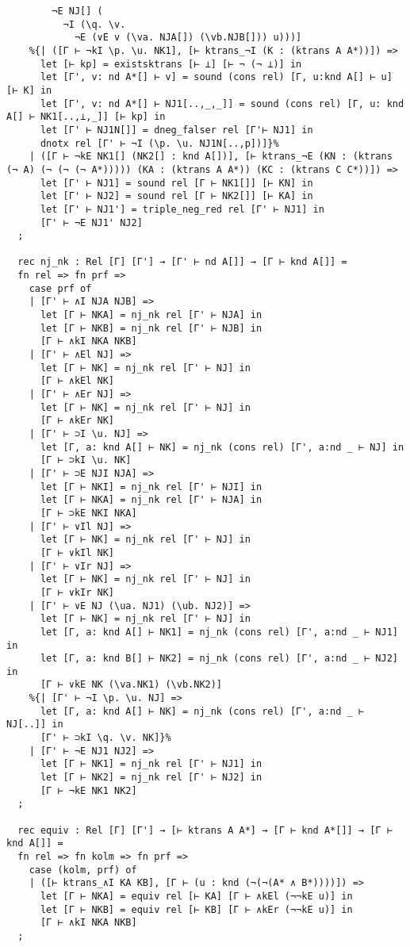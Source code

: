 \documentclass{article}
\begin{document}
\begin{lstlisting}
        ¬E NJ[] (
          ¬I (\q. \v.
            ¬E (∨E v (\va. NJA[]) (\vb.NJB[])) u)))]
    %{| ([Γ ⊢ ¬kI \p. \u. NK1], [⊢ ktrans_¬I (K : (ktrans A A*))]) =>
      let [⊢ kp] = existsktrans [⊢ ⊥] [⊢ ¬ (¬ ⊥)] in
      let [Γ', v: nd A*[] ⊢ v] = sound (cons rel) [Γ, u:knd A[] ⊢ u] [⊢ K] in
      let [Γ', v: nd A*[] ⊢ NJ1[..,_,_]] = sound (cons rel) [Γ, u: knd A[] ⊢ NK1[..,⊥,_]] [⊢ kp] in
      let [Γ' ⊢ NJ1N[]] = dneg_falser rel [Γ'⊢ NJ1] in
      dnotx rel [Γ' ⊢ ¬I (\p. \u. NJ1N[..,p])]}%
    | ([Γ ⊢ ¬kE NK1[] (NK2[] : knd A[])], [⊢ ktrans_¬E (KN : (ktrans (¬ A) (¬ (¬ (¬ A*))))) (KA : (ktrans A A*)) (KC : (ktrans C C*))]) =>
      let [Γ' ⊢ NJ1] = sound rel [Γ ⊢ NK1[]] [⊢ KN] in
      let [Γ' ⊢ NJ2] = sound rel [Γ ⊢ NK2[]] [⊢ KA] in
      let [Γ' ⊢ NJ1'] = triple_neg_red rel [Γ' ⊢ NJ1] in
      [Γ' ⊢ ¬E NJ1' NJ2]
  ;
  
  rec nj_nk : Rel [Γ] [Γ'] → [Γ' ⊢ nd A[]] → [Γ ⊢ knd A[]] = 
  fn rel => fn prf =>
    case prf of
    | [Γ' ⊢ ∧I NJA NJB] =>
      let [Γ ⊢ NKA] = nj_nk rel [Γ' ⊢ NJA] in
      let [Γ ⊢ NKB] = nj_nk rel [Γ' ⊢ NJB] in
      [Γ ⊢ ∧kI NKA NKB]
    | [Γ' ⊢ ∧El NJ] =>
      let [Γ ⊢ NK] = nj_nk rel [Γ' ⊢ NJ] in
      [Γ ⊢ ∧kEl NK]
    | [Γ' ⊢ ∧Er NJ] =>
      let [Γ ⊢ NK] = nj_nk rel [Γ' ⊢ NJ] in
      [Γ ⊢ ∧kEr NK]
    | [Γ' ⊢ ⊃I \u. NJ] =>
      let [Γ, a: knd A[] ⊢ NK] = nj_nk (cons rel) [Γ', a:nd _ ⊢ NJ] in
      [Γ ⊢ ⊃kI \u. NK]
    | [Γ' ⊢ ⊃E NJI NJA] =>
      let [Γ ⊢ NKI] = nj_nk rel [Γ' ⊢ NJI] in
      let [Γ ⊢ NKA] = nj_nk rel [Γ' ⊢ NJA] in
      [Γ ⊢ ⊃kE NKI NKA]
    | [Γ' ⊢ ∨Il NJ] =>
      let [Γ ⊢ NK] = nj_nk rel [Γ' ⊢ NJ] in
      [Γ ⊢ ∨kIl NK]
    | [Γ' ⊢ ∨Ir NJ] =>
      let [Γ ⊢ NK] = nj_nk rel [Γ' ⊢ NJ] in
      [Γ ⊢ ∨kIr NK]
    | [Γ' ⊢ ∨E NJ (\ua. NJ1) (\ub. NJ2)] =>
      let [Γ ⊢ NK] = nj_nk rel [Γ' ⊢ NJ] in
      let [Γ, a: knd A[] ⊢ NK1] = nj_nk (cons rel) [Γ', a:nd _ ⊢ NJ1] in
      let [Γ, a: knd B[] ⊢ NK2] = nj_nk (cons rel) [Γ', a:nd _ ⊢ NJ2] in
      [Γ ⊢ ∨kE NK (\va.NK1) (\vb.NK2)]
    %{| [Γ' ⊢ ¬I \p. \u. NJ] =>
      let [Γ, a: knd A[] ⊢ NK] = nj_nk (cons rel) [Γ', a:nd _ ⊢ NJ[..]] in
      [Γ' ⊢ ⊃kI \q. \v. NK]}%
    | [Γ' ⊢ ¬E NJ1 NJ2] =>
      let [Γ ⊢ NK1] = nj_nk rel [Γ' ⊢ NJ1] in
      let [Γ ⊢ NK2] = nj_nk rel [Γ' ⊢ NJ2] in
      [Γ ⊢ ¬kE NK1 NK2]
  ;
  
  rec equiv : Rel [Γ] [Γ'] → [⊢ ktrans A A*] → [Γ ⊢ knd A*[]] → [Γ ⊢ knd A[]] =
  fn rel => fn kolm => fn prf =>
    case (kolm, prf) of
    | ([⊢ ktrans_∧I KA KB], [Γ ⊢ (u : knd (¬(¬(A* ∧ B*))))]) =>
      let [Γ ⊢ NKA] = equiv rel [⊢ KA] [Γ ⊢ ∧kEl (¬¬kE u)] in 
      let [Γ ⊢ NKB] = equiv rel [⊢ KB] [Γ ⊢ ∧kEr (¬¬kE u)] in
      [Γ ⊢ ∧kI NKA NKB]
  ;
\end{lstlisting}



















  
  
\end{document}
